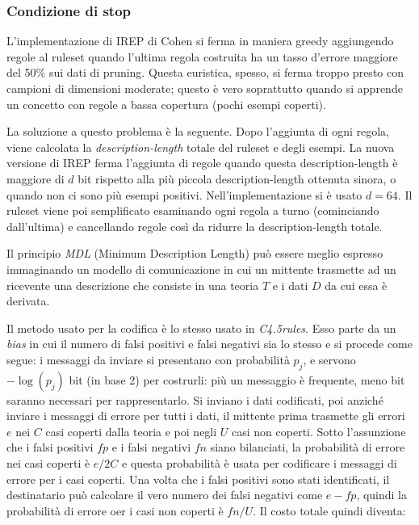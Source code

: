 \subsubsection*{Condizione di stop}
L'implementazione di IREP di Cohen si ferma in maniera greedy aggiungendo regole al ruleset quando l'ultima regola costruita ha un tasso d'errore maggiore del 50\% sui dati di pruning. Questa euristica, spesso, si ferma troppo presto con campioni di dimensioni moderate; questo è vero soprattutto quando si apprende un concetto con regole a bassa copertura (pochi esempi coperti).

La soluzione a questo problema è la seguente. Dopo l'aggiunta di ogni regola, viene calcolata la \textit{description-length} totale del ruleset e degli esempi. La nuova versione di IREP ferma l'aggiunta di regole quando questa description-length è maggiore di $d$ bit rispetto alla più piccola description-length ottenuta sinora, o quando non ci sono più esempi positivi. Nell'implementazione si è usato $d = 64$. Il ruleset viene poi semplificato esaminando ogni regola a turno (cominciando dall'ultima) e cancellando regole così da ridurre la description-length totale. 

Il principio \emph{MDL} (Minimum Description Length) può essere meglio espresso immaginando un modello di comunicazione in cui un mittente trasmette ad un ricevente una descrizione che consiste in una teoria $T$ e i dati $D$ da cui essa è derivata\cite{Quinlan:1989:IDT:70758.70761}.

Il metodo usato per la codifica è lo stesso usato in \emph{C4.5rules}\cite{Quinlan95mdland}. Esso parte da un \emph{bias} in cui il numero di falsi positivi e falsi negativi sia lo stesso e si procede come segue: i messaggi da inviare si presentano con probabilità $p_j$, e servono $-\log(p_j)$ bit (in base 2) per costrurli: più un messaggio è frequente, meno bit saranno necessari per rappresentarlo. Si inviano i dati codificati, poi anziché inviare i messaggi di errore per tutti i dati, il mittente prima trasmette gli errori $e$ nei $C$ casi coperti dalla teoria e poi negli $U$ casi non coperti. Sotto l'assunzione che i falsi positivi $fp$ e i falsi negativi $fn$ siano bilanciati, la probabilità di errore nei casi coperti è $e/2C$ e questa probabilità è usata per codificare i messaggi di errore per i casi coperti. Una volta che i falsi positivi sono stati identificati, il destinatario può calcolare il vero numero dei falsi negativi come $e-fp$, quindi la probabilità di errore oer i casi non coperti è $fn/U$. Il costo totale quindi diventa:

